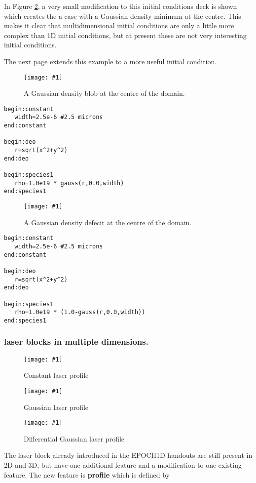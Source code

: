 \documentclass[12pt,a4paper]{article}
\newcommand{\boxverbatim}[1]{\begin{Verbatim}[obeytabs=true,frame=single,
  framerule=0.5mm,rulecolor=\color{warwickmid},formatcom=\color{black},label=#1]}
\newcommand{\inlineemph}[1]{{\color{warwicklight} \bf{#1}}}
\newcommand{\scaledcapimage}[4]
  {{\begin{figure}\centering\texttt{[image: \#1]}\caption{#3}
    \label{#2} \end{figure}}}
\begin{document}
In Figure \ref{inversegaussblob}, a very small modification to this initial
conditions deck is shown which creates the a case with a Gaussian density
minimum at the centre. This makes it clear that multidimensional initial
conditions are only a little more complex than 1D initial conditions, but at
present these are not very interesting initial conditions.

The next page extends this example to a more useful initial condition. \\

\scaledcapimage{./images/gaussic}{gaussblob}{A Gaussian density blob at the
centre of the domain.}{0.4}

\boxverbatim{species block to set up Gaussian density blob}
begin:constant
   width=2.5e-6 #2.5 microns
end:constant

begin:deo
   r=sqrt(x^2+y^2)
end:deo

begin:species1
   rho=1.0e19 * gauss(r,0.0,width)
end:species1
\end{Verbatim}

\scaledcapimage{./images/invgaussic}{inversegaussblob}{A Gaussian density
defecit at the centre of the domain.}{0.4}

\begin{minipage}{\textwidth}
\boxverbatim{species block to set up Gaussian density blob}
begin:constant
   width=2.5e-6 #2.5 microns
end:constant

begin:deo
   r=sqrt(x^2+y^2)
end:deo

begin:species1
   rho=1.0e19 * (1.0-gauss(r,0.0,width))
end:species1
\end{Verbatim}
\end{minipage}

\subsubsection{\inlineemph{laser} blocks in multiple dimensions.}

\scaledcapimage{./images/profile_flat}{flatlaser}{Constant laser
profile}{0.4} \scaledcapimage{./images/profile_gauss}{gausslaser}{Gaussian
laser profile}{0.4}
\scaledcapimage{./images/profile_diff_gauss}{diffgausslaser}{Differential
Gaussian laser profile}{0.4}

The laser block already introduced in the EPOCH1D handouts are still present in
2D and 3D, but have one additional feature and a modification to one existing
feature. The new feature is \inlineemph{profile} which is defined
by\\
\end{document}

